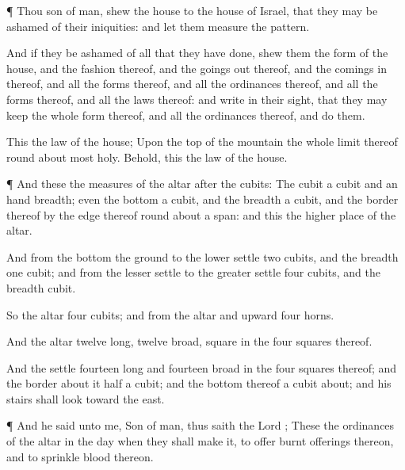 {\par }{\PP {}¶ Thou
son of
man,
shew the
house to the
house of
Israel, that they may be
ashamed of their
iniquities: and let them
measure the
pattern.

And if they be
ashamed of all that they have
done,
shew them the
form of the
house, and the
fashion thereof, and the goings
out thereof, and the
comings in thereof, and all the
forms thereof, and all the
ordinances thereof, and all the
forms thereof, and all the
laws thereof: and
write
{} in their
sight, that they may
keep the whole
form thereof, and all the
ordinances thereof, and
do them.

This
{} the
law of the
house; Upon the
top of the
mountain the whole
limit thereof round
about
{}
most
holy. Behold, this
{} the
law of the
house.


\par }{\PP {}¶ And these
{} the
measures of the
altar after the
cubits: The
cubit
{} a
cubit and an hand
breadth; even the
bottom
{} a
cubit, and the
breadth a
cubit, and the
border thereof by the
edge thereof round
about
{}
a
span: and this
{} the higher
place of the
altar.

And from the
bottom
{} the
ground
{} to the
lower
settle
{}
two
cubits, and the
breadth
one
cubit; and from the
lesser
settle
{} to the
greater
settle
{}
four
cubits, and the
breadth
{}
cubit.

So the
altar
{}
four
cubits; and from the
altar and
upward
{}
four
horns.

And the
altar
{}
twelve
{}
long,
twelve
broad,
square in the
four
squares thereof.

And the
settle
{}
fourteen
{}
long and
fourteen
broad in the
four
squares thereof; and the
border
about it
{}
half a
cubit; and the
bottom thereof
{} a
cubit
about; and his
stairs shall
look toward the
east.


\par }{\PP {}¶ And he
said unto me,
Son of
man, thus
saith the
Lord
{}; These
{} the
ordinances of the
altar in the
day when they shall
make it, to
offer burnt
offerings thereon, and to
sprinkle
blood thereon.

}
